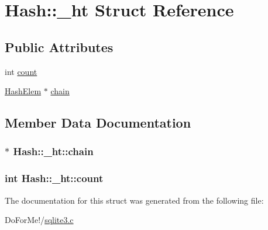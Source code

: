 \hypertarget{struct_hash_1_1__ht}{\section{Hash\-:\-:\-\_\-ht Struct Reference}
\label{struct_hash_1_1__ht}
}
\subsection*{Public Attributes}
\begin{DoxyCompactItemize}
\item 
int \hyperlink{struct_hash_1_1__ht_a0677191178b6c7c5c6c2880f41cf24b1}{count}
\item 
\hyperlink{struct_hash_elem}{Hash\-Elem} $\ast$ \hyperlink{struct_hash_1_1__ht_a56fc145e7d38d9440d85ab2ea63a48ac}{chain}
\end{DoxyCompactItemize}


\subsection{Member Data Documentation}
\hypertarget{struct_hash_1_1__ht_a56fc145e7d38d9440d85ab2ea63a48ac}{
\subsubsection[{chain}]{$\ast$ Hash\-::\-\_\-ht\-::chain}}\label{struct_hash_1_1__ht_a56fc145e7d38d9440d85ab2ea63a48ac}
\hypertarget{struct_hash_1_1__ht_a0677191178b6c7c5c6c2880f41cf24b1}{
\subsubsection[{count}]{\setlength{\rightskip}{0pt plus 5cm}int Hash\-::\-\_\-ht\-::count}}\label{struct_hash_1_1__ht_a0677191178b6c7c5c6c2880f41cf24b1}


The documentation for this struct was generated from the following file\-:\begin{DoxyCompactItemize}
\item 
Do\-For\-Me!/\hyperlink{sqlite3_8c}{sqlite3.\-c}\end{DoxyCompactItemize}
